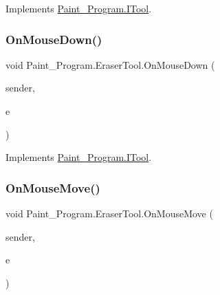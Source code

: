Implements \mbox{\hyperlink{interface_paint___program_1_1_i_tool_a951b844bcbf47a6c306104fa86be7a5d}{Paint\+\_\+\+Program.\+I\+Tool}}.

\mbox{\label{class_paint___program_1_1_eraser_tool_a4af3cc5379de2a2aec2a5d622801ca86}} 
\subsubsection{\texorpdfstring{On\+Mouse\+Down()}{OnMouseDown()}}
{\footnotesize\ttfamily void Paint\+\_\+\+Program.\+Eraser\+Tool.\+On\+Mouse\+Down (\begin{DoxyParamCaption}\item[{object}]{sender,  }\item[{Mouse\+Event\+Args}]{e }\end{DoxyParamCaption})\hspace{0.3cm}{\ttfamily [inline]}}



Implements \mbox{\hyperlink{interface_paint___program_1_1_i_tool_a73d8797f4f2b1e0d8efe8aadcd44e840}{Paint\+\_\+\+Program.\+I\+Tool}}.

\mbox{\label{class_paint___program_1_1_eraser_tool_a1a4e26847ca43fc583017ea76396c19c}} 
\subsubsection{\texorpdfstring{On\+Mouse\+Move()}{OnMouseMove()}}
{\footnotesize\ttfamily void Paint\+\_\+\+Program.\+Eraser\+Tool.\+On\+Mouse\+Move (\begin{DoxyParamCaption}\item[{object}]{sender,  }\item[{Mouse\+Event\+Args}]{e }\end{DoxyParamCaption})\hspace{0.3cm}{\ttfamily [inline]}}



